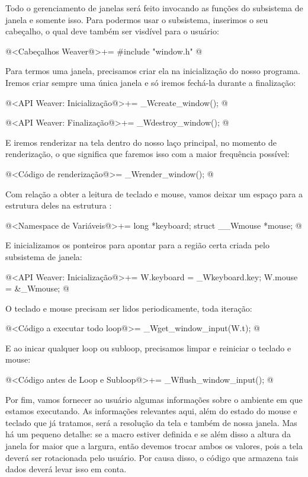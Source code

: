 
Todo o gerenciamento de janelas será feito invocando as funções do
subsistema de janela e somente isso. Para podermos usar o subsistema,
inserimos o seu cabeçalho, o qual deve também ser visdível para o
usuário:

\iniciocodigo
@<Cabeçalhos Weaver@>+=
#include "window.h"
@
\fimcodigo

Para termos uma janela, precisamos criar ela na inicialização do nosso
programa. Iremos criar sempre uma única janela e só iremos fechá-la
durante a finalização:

\iniciocodigo
@<API Weaver: Inicialização@>+=
_Wcreate_window();
@
\fimcodigo

\iniciocodigo
@<API Weaver: Finalização@>+=
_Wdestroy_window();
@
\fimcodigo

E iremos renderizar na tela dentro do nosso laço principal, no momento
de renderização, o que significa que faremos isso com a maior
frequência possível:

\iniciocodigo
@<Código de renderização@>=
_Wrender_window();
@
\fimcodigo

Com relação a obter a leitura de teclado e mouse, vamos deixar um
espaço para a estrutura deles na estrutura :

\iniciocodigo
@<Namespace de Variáveis@>+=
long *keyboard;
struct __Wmouse *mouse;
@
\fimcodigo

E inicializamos os ponteiros para apontar para a região certa criada
pelo subsistema  de janela:

\iniciocodigo
@<API Weaver: Inicialização@>+=
W.keyboard = _Wkeyboard.key;
W.mouse = &_Wmouse;
@
\fimcodigo

O teclado e mouse precisam ser lidos periodicamente, toda iteração:

\iniciocodigo
@<Código a executar todo loop@>=
_Wget_window_input(W.t);
@
\fimcodigo

E ao inicar qualquer loop ou subloop, precisamos limpar e reiniciar o
teclado e mouse:

\iniciocodigo
@<Código antes de Loop e Subloop@>+=
_Wflush_window_input();
@
\fimcodigo

Por fim, vamos fornecer ao usuário algumas informações sobre o
ambiente em que estamos executando. As informações relevantes aqui,
além do estado do mouse e teclado que já tratamos, será a resolução da
tela e também de nossa janela. Mas há um pequeno detalhe: se a
macro  estiver definida e se além
disso a altura da janela for maior que a largura, então
devemos trocar ambos os valores, pois a tela deverá ser rotacionada
pelo usuário. Por causa disso, o código que armazena tais dados deverá
levar isso em conta.

